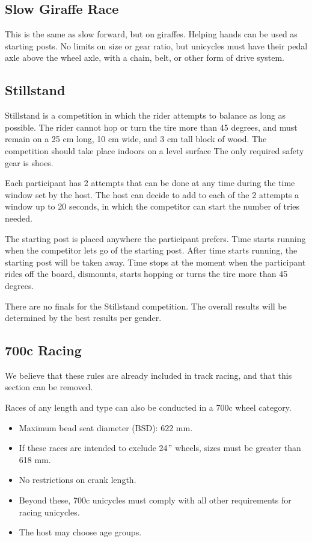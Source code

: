 \subsection{Slow Giraffe Race}

This is the same as slow forward, but on giraffes.
Helping hands can be used as starting posts.
No limits on size or gear ratio, but unicycles must have their pedal axle above the wheel axle, with a chain, belt, or other form of drive system.

\subsection{Stillstand}
Stillstand is a competition in which the rider attempts to balance as long as possible.
The rider cannot hop or turn the tire more than 45 degrees, and must remain on a 25 cm long, 10 cm wide, and 3 cm tall block of wood.
The competition should take place indoors on a level surface
The only required safety gear is shoes.

Each participant has 2 attempts that can be done at any time during the time window set by the host.
The host can decide to add to each of the 2 attempts a window up to 20 seconds, in which the competitor can start the number of tries needed.

The starting post is placed anywhere the participant prefers.
Time starts running when the competitor lets go of the starting post.
After time starts running, the starting post will be taken away.
Time stops at the moment when the participant rides off the board, dismounts, starts hopping or turns the tire more than 45 degrees.

There are no finals for the Stillstand competition.
The overall results will be determined by the best results per gender.

\subsection{700c Racing}

\begin{comment-2016}
We believe that these rules are already included in track racing, and that this section can be removed.
\end{comment-2016}


Races of any length and type can also be conducted in a 700c wheel category.
\begin{itemize}
\item Maximum bead seat diameter (BSD): 622 mm.
\item If these races are intended to exclude 24$"$ wheels, sizes must be greater than 618 mm.
\item No restrictions on crank length.
\item Beyond these, 700c unicycles must comply with all other requirements for racing unicycles.
\item The host may choose age groups.
\end{itemize}

